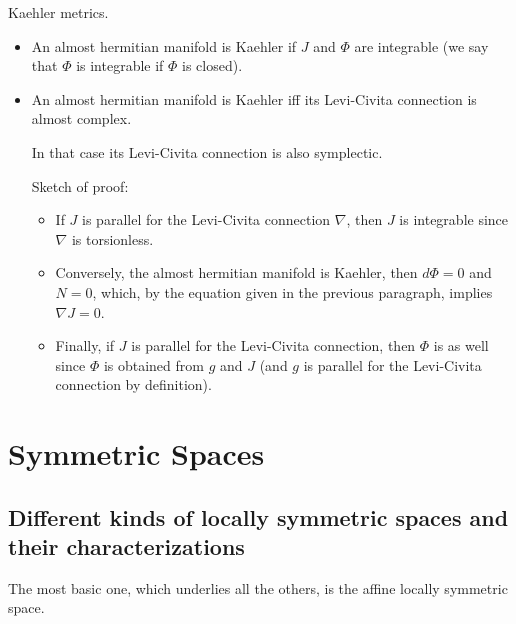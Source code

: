 \documentclass{report}
\theoremstyle{definition}
\begin{document}
Kaehler metrics.
\begin{itemize}
    \item An almost hermitian manifold is Kaehler if $J$ and $\Phi$ are integrable (we say that $\Phi$ is integrable if $\Phi$ is closed).
    \item An almost hermitian manifold is Kaehler iff its Levi-Civita connection is almost complex.

    In that case its Levi-Civita connection is also symplectic.

    Sketch of proof:
    \begin{itemize}
        \item If $J$ is parallel for the Levi-Civita connection $\nabla$, then $J$ is integrable since $\nabla$ is torsionless.
        \item Conversely, the almost hermitian manifold is Kaehler, then $d\Phi=0$ and $N=0$, which, by the equation given in the previous paragraph, implies $\nabla J=0$.
        \item Finally, if $J$ is parallel for the Levi-Civita connection, then $\Phi$ is as well since $\Phi$ is obtained from $g$ and $J$ (and $g$ is parallel for the Levi-Civita connection by definition).
    \end{itemize}
\end{itemize}

\section{Symmetric Spaces}

\subsection{Different kinds of locally symmetric spaces and their characterizations}

The most basic one, which underlies all the others, is the affine locally symmetric space.
\end{document}
